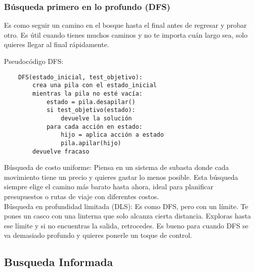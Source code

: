 \subsubsection*{Búsqueda primero en lo profundo (DFS)} 

Es como seguir un camino en el bosque hasta el final antes de regresar y probar otro. Es útil 
cuando tienes muchos caminos y no te importa cuán largo sea, solo quieres llegar al 
final rápidamente.


\begin{myitemize} 
    \item[] Pseudocódigo DFS:
    \begin{verbatim}
    DFS(estado_inicial, test_objetivo):
        crea una pila con el estado_inicial
        mientras la pila no esté vacía:
            estado = pila.desapilar()
            si test_objetivo(estado):
                devuelve la solución
            para cada acción en estado:
                hijo = aplica acción a estado
                pila.apilar(hijo)
        devuelve fracaso    
    \end{verbatim}
\end{myitemize}


Búsqueda de costo uniforme: Piensa en un sistema de subasta donde cada movimiento 
tiene un precio y quieres gastar lo menos posible. Esta búsqueda siempre elige el 
camino más barato hasta ahora, ideal para planificar presupuestos o rutas de viaje 
con diferentes costos.\\ 

Búsqueda en profundidad limitada (DLS): Es como DFS, pero con un límite. Te pones 
un casco con una linterna que solo alcanza cierta distancia. Exploras hasta ese 
límite y si no encuentras la salida, retrocedes. Es bueno para cuando DFS se va 
demasiado profundo y quieres ponerle un toque de control.

\subsection{Busqueda Informada}

